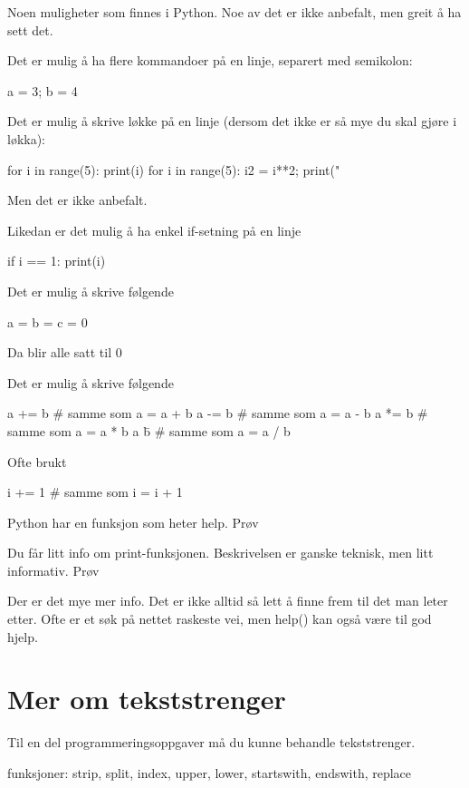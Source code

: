 Noen muligheter som finnes i Python. Noe av det er ikke anbefalt, men greit å ha sett det. 

Det er mulig å ha flere kommandoer på en linje, separert med semikolon:
\begin{usncodebox}
a = 3; b = 4
\end{usncodebox}

Det er mulig å skrive løkke på en linje (dersom det ikke er så mye du skal gjøre i løkka):
\begin{usncodebox}
for i in range(5): print(i)
for i in range(5): i2 = i**2; print("%
\end{usncodebox}

Men det er ikke anbefalt. 

Likedan er det mulig å ha enkel if-setning på en linje
\begin{usncodebox}
if i == 1: print(i)
\end{usncodebox}

Det er mulig å skrive følgende
\begin{usncodebox}
a = b = c = 0
\end{usncodebox}
Da blir alle satt til 0

Det er mulig å skrive følgende
\begin{usncodebox}
a += b    # samme som a = a + b
a -= b    # samme som a = a - b
a *= b    # samme som a = a * b
a \= b    # samme som a = a / b
\end{usncodebox}

Ofte brukt 
\begin{usncodebox}
i += 1    # samme som i = i + 1
\end{usncodebox}

Python har en funksjon som heter help. Prøv 

Du får litt info om print-funksjonen. Beskrivelsen er ganske teknisk, men litt informativ.
Prøv 

Der er det mye mer info. Det er ikke alltid så lett å finne frem til det man leter etter. Ofte er et søk på nettet raskeste vei, men help() kan også være til god hjelp. 

\section{Mer om tekststrenger}

Til en del programmeringsoppgaver må du kunne behandle tekststrenger.

funksjoner: strip, split, index, upper, lower, startswith, endswith, replace

